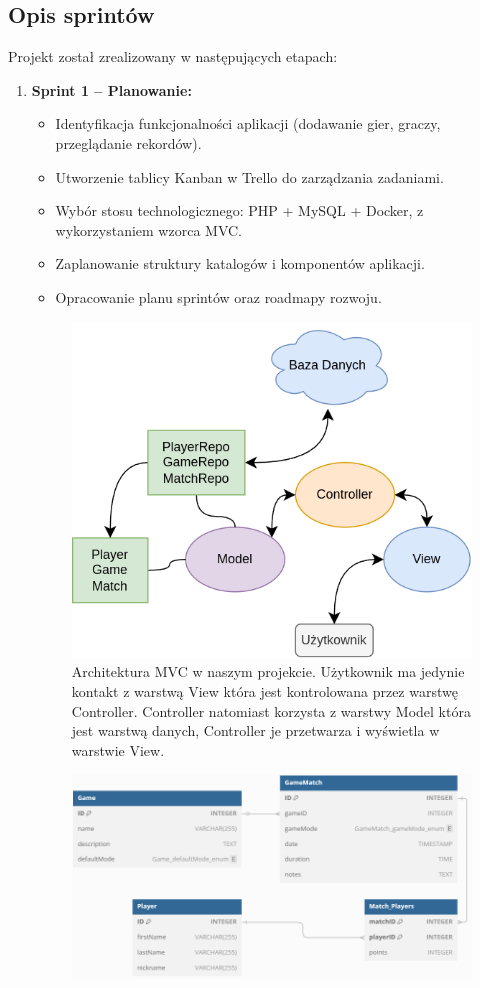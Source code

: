 \documentclass[12pt,a4paper]{article}
\begin{document}
\subsection{Opis sprintów}
Projekt został zrealizowany w następujących etapach:
\begin{enumerate}
	\item \textbf{Sprint 1 -- Planowanie:}
	\begin{itemize}
		\item Identyfikacja funkcjonalności aplikacji (dodawanie gier, graczy, przeglądanie rekordów).
		\item Utworzenie tablicy Kanban w Trello do zarządzania zadaniami.
		\item Wybór stosu technologicznego: PHP + MySQL + Docker, z wykorzystaniem wzorca MVC.
		\item Zaplanowanie struktury katalogów i komponentów aplikacji.
		\item Opracowanie planu sprintów oraz roadmapy rozwoju.
	\end{itemize}
	\begin{figure}[h!]
		\centering
		\includegraphics[width=0.8\linewidth]{media/architektura}
		\caption{Architektura MVC w naszym projekcie. Użytkownik ma jedynie kontakt z warstwą View która jest kontrolowana przez warstwę Controller. Controller natomiast korzysta z warstwy Model która jest warstwą danych, Controller je przetwarza i wyświetla w warstwie View.}
		\label{fig:architektura}
	\end{figure}
	\newpage
	\begin{figure}[h!]
		\centering
		\includegraphics[width=1\linewidth]{media/baza_danych}

\end{figure}
\end{enumerate}
\end{document}
